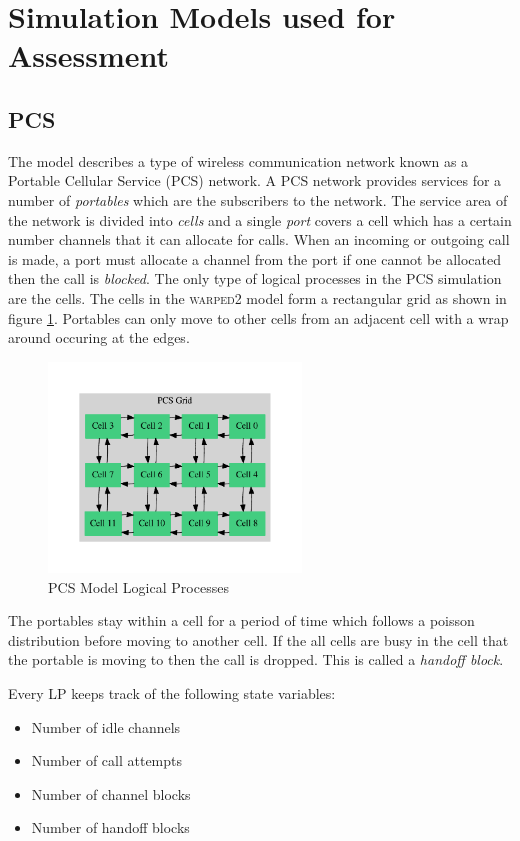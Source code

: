 \documentclass[11pt]{book}
\begin{document}
\section{Simulation Models used for Assessment}

\subsection{PCS}

The model describes a type of wireless communication network known as a Portable Cellular
Service (PCS) network. A PCS network provides services for a number of \emph{portables} which
are the subscribers to the network. The service area of the network is divided into
\emph{cells} and a single \emph{port} covers a cell which has a certain number channels that
it can allocate for calls. When an incoming or outgoing call is made, a port must allocate
a channel from the port if one cannot be allocated then the call is \emph{blocked}\cite{lin-96b}.
The only type of logical processes in the PCS simulation are the cells. The cells in the
\textsc{warped2} model form a rectangular grid as shown in figure \ref{pcs_model_lps}.
Portables can only move to other cells from an adjacent cell with a wrap around occuring
at the edges.

\begin{figure}[H]
    \centering
    \includegraphics[width=0.6\textwidth]{figs/graphviz/pcs_model.pdf}
    \caption{PCS Model Logical Processes}\label{pcs_model_lps}
\end{figure}

The portables stay within a cell for a period of time which follows a poisson distribution
before moving to another cell. If the all cells are busy in the cell that the portable
is moving to then the call is dropped. This is called a \emph{handoff block}.

Every LP keeps track of the following state variables:
\begin{itemize}
    \item Number of idle channels
    \item Number of call attempts
    \item Number of channel blocks
    \item Number of handoff blocks
\end{itemize}
\end{document}
